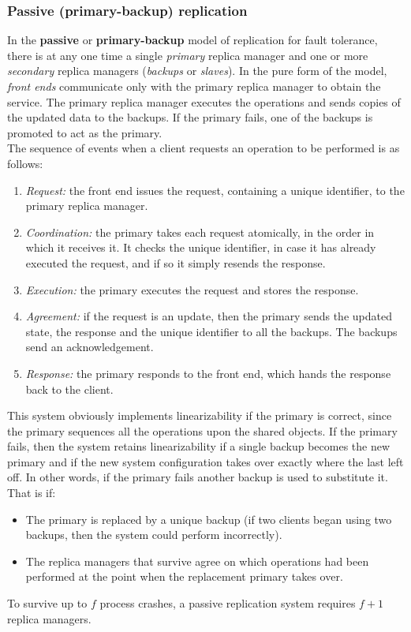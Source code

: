\subsubsection{Passive (primary-backup) replication}
In the \textbf{passive} or \textbf{primary-backup} model of replication for fault tolerance, there is at any one time a single \textit{primary} replica manager and one or more \textit{secondary} replica managers (\textit{backups} or \textit{slaves}). In the pure form of the model, \textit{front ends} communicate only with the primary replica manager to obtain the service. The primary replica manager executes the operations and sends copies of the updated data to the backups. If the primary fails, one of the backups is promoted to act as the primary.\\
The sequence of events when a client requests an operation to be performed is as
follows:
\begin{enumerate}
	\item \textit{Request:} the front end issues the request, containing a unique identifier, to the primary replica manager.
	\item \textit{Coordination:} the primary takes each request atomically, in the order in which it receives it. It checks the unique identifier, in case it has already executed the request, and if so it simply resends the response.
	\item \textit{Execution:} the primary executes the request and stores the response.
	\item \textit{Agreement:} if the request is an update, then the primary sends the updated state, the response and the unique identifier to all the backups. The backups send an acknowledgement.
	\item \textit{Response:} the primary responds to the front end, which hands the response back to the client.
\end{enumerate}
This system obviously implements linearizability if the primary is correct, since the
primary sequences all the operations upon the shared objects. If the primary fails, then
the system retains linearizability if a single backup becomes the new primary and if the
new system configuration takes over exactly where the last left off. In other words, if the primary fails another backup is used to substitute it. That is if:
\begin{itemize}
	\item The primary is replaced by a unique backup (if two clients began using two
	backups, then the system could perform incorrectly).
	\item The replica managers that survive agree on which operations had been performed
	at the point when the replacement primary takes over.
\end{itemize}
To survive up to $f$ process crashes, a passive replication system requires $f+1$ replica managers.

